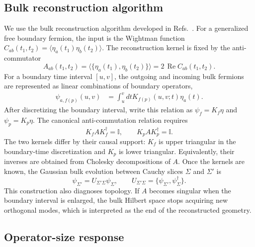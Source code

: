 \documentclass[pdflatex,sn-nature]{sn-jnl}
\begin{document}
\subsection{Bulk reconstruction algorithm}
\label{sec:methods-bulk-reconstruction}

We use the bulk reconstruction algorithm developed in Refs.~\cite{nebabu2024bulk,nebabu2026two}. For a generalized free boundary fermion, the input is the Wightman function \(C_{ab}(t_1,t_2)=\langle\eta_a(t_1)\eta_b(t_2)\rangle\). The reconstruction kernel is fixed by the anti-commutator
\begin{equation}
A_{ab}(t_1,t_2)
=
\langle\{\eta_a(t_1),\eta_b(t_2)\}\rangle
=2\,\operatorname{Re}C_{ab}(t_1,t_2).
\label{eq:methods-anticommutator}
\end{equation}
For a boundary time interval \([u,v]\), the outgoing and incoming bulk fermions are represented as linear combinations of boundary operators,
\begin{align}
\psi_{a,f(p)}(u,v)&=\int_u^v dt K_{f(p)}(u,v;t)\eta_a(t).\label{eq:HKLL_kernel}
\end{align}
After discretizing the boundary interval, write this relation as \(\psi_f=K_f\eta\) and \(\psi_p=K_p\eta\). The canonical anti-commutation relation requires
\begin{equation}
K_fAK_f^\dagger=\mathbb I,\qquad
K_pAK_p^\dagger=\mathbb I .
\label{eq:methods-kernel-orthonormal}
\end{equation}
The two kernels differ by their causal support: \(K_f\) is upper triangular in the boundary-time discretization and \(K_p\) is lower triangular. Equivalently, their inverses are obtained from Cholesky decompositions of \(A\). Once the kernels are known, the Gaussian bulk evolution between Cauchy slices \(\Sigma\) and \(\Sigma'\) is
\begin{equation}
\psi_{\Sigma'}=U_{\Sigma'\Sigma}\psi_\Sigma,
\qquad
U_{\Sigma'\Sigma}=\{\psi_{\Sigma'},\psi_\Sigma^\dagger\}.
\label{eq:methods-bulk-unitary}
\end{equation}
This construction also diagnoses topology. If \(A\) becomes singular when the boundary interval is enlarged, the bulk Hilbert space stops acquiring new orthogonal modes, which is interpreted as the end of the reconstructed geometry.

\subsection{Operator-size response}
\label{sec:methods-operator-size}
\end{document}
